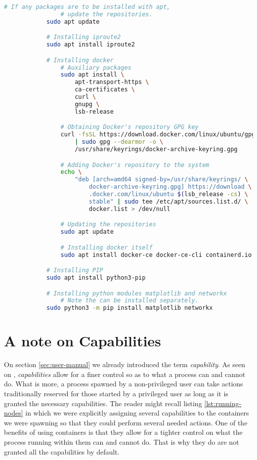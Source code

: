         \begin{lstlisting}[language = bash, caption = Commands for installing needed dependencies., label = lst:dependency-installation]
            # If any packages are to be installed with apt,
                # update the repositories.
            sudo apt update

            # Installing iproute2
            sudo apt install iproute2

            # Installing docker
                # Auxiliary packages
                sudo apt install \
                    apt-transport-https \
                    ca-certificates \
                    curl \
                    gnupg \
                    lsb-release

                # Obtaining Docker's repository GPG key
                curl -fsSL https://download.docker.com/linux/ubuntu/gpg \
                    | sudo gpg --dearmor -o \
                    /usr/share/keyrings/docker-archive-keyring.gpg

                # Adding Docker's repository to the system
                echo \
                    "deb [arch=amd64 signed-by=/usr/share/keyrings/ \
                        docker-archive-keyring.gpg] https://download \
                        .docker.com/linux/ubuntu $(lsb_release -cs) \
                        stable" | sudo tee /etc/apt/sources.list.d/ \
                        docker.list > /dev/null

                # Updating the repositories
                sudo apt update

                # Installing docker itself
                sudo apt install docker-ce docker-ce-cli containerd.io

            # Installing PIP
            sudo apt install python3-pip

            # Installing python modules matplotlib and networkx
                # Note the can be installed separately.
            sudo python3 -m pip install matplotlib networkx
        \end{lstlisting}

    \section{A note on Capabilities}
        On section \ref{sec:user-manual} we already introduced the term \textit{capability}. As seen on \cite{bib:man-capabilities}, \textit{capabilities} allow for a finer control so as to what a process can and cannot do. What is more, a process spawned by a non-privileged user can take actions traditionally reserved for those started by a privileged user as long as it is granted the necessary capabilities. The reader might recall listing \ref{lst:running-nodes} in which we were explicitly assigning several capabilities to the containers we were spawning so that they could perform several needed actions. One of the benefits of using containers is that they allow for a tighter control on what the process running within them can and cannot do. That is why they do are not granted all the capabilities by default.\\

